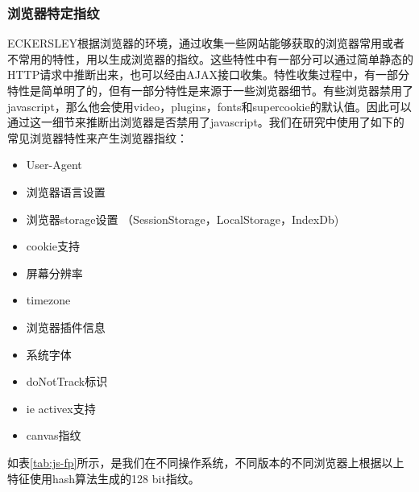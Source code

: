 \documentclass[doctor,privacy,twoside]{buaa_mac}
\begin{document}
\subsubsection{浏览器特定指纹}
ECKERSLEY根据浏览器的环境，通过收集一些网站能够获取的浏览器常用或者不常用的特性，用以生成浏览器的指纹。这些特性中有一部分可以通过简单静态的HTTP请求中推断出来，也可以经由AJAX接口收集。特性收集过程中，有一部分特性是简单明了的，但有一部分特性是来源于一些浏览器细节。有些浏览器禁用了javascript，那么他会使用video，plugins，fonts和supercookie的默认值。因此可以通过这一细节来推断出浏览器是否禁用了javascript。我们在研究中使用了如下的常见浏览器特性来产生浏览器指纹：

\begin{itemize}
\item User-Agent
\item 浏览器语言设置
\item 浏览器storage设置 （SessionStorage，LocalStorage，IndexDb)
\item cookie支持
\item 屏幕分辨率
\item timezone
\item 浏览器插件信息
\item 系统字体
\item doNotTrack标识
\item ie activex支持
\item canvas指纹
 \end{itemize}
 
 如表\ref{tab:js-fp}所示，是我们在不同操作系统，不同版本的不同浏览器上根据以上特征使用hash算法生成的128 bit指纹。
 
\end{document}
